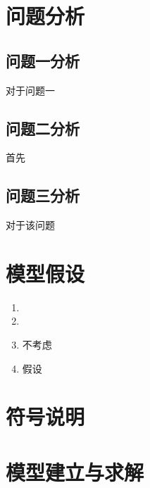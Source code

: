 \documentclass{ctexart}
\begin{document}
    \section{问题分析}
    \subsection{问题一分析}
    对于问题一
    \subsection{问题二分析}
    首先
    \subsection{问题三分析}
    对于该问题
    \section{模型假设}
    \begin{enumerate}[(1)]
        \item 
        \item 
        \item 不考虑
        \item 假设
    \end{enumerate}

    \section{符号说明}
\begin{center}
\end{center}

    \section{模型建立与求解}
\end{document}
